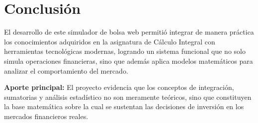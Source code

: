 \documentclass[12pt,a4paper]{article}
\begin{document}
\section{Conclusión}

El desarrollo de este simulador de bolsa web permitió integrar de manera práctica los conocimientos adquiridos en la asignatura de Cálculo Integral con herramientas tecnológicas modernas, logrando un sistema funcional que no solo simula operaciones financieras, sino que además aplica modelos matemáticos para analizar el comportamiento del mercado.

\begin{cajaconcepto}
\textbf{Aporte principal:} El proyecto evidencia que los conceptos de integración, sumatorias y análisis estadístico no son meramente teóricos, sino que constituyen la base matemática sobre la cual se sustentan las decisiones de inversión en los mercados financieros reales.
\end{cajaconcepto}
\end{document}
